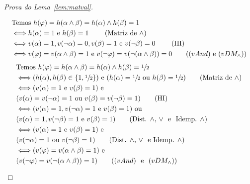 \begin{proof}[Prova do Lema~\ref{lem:matval}]
\begin{provaporcasos}
\begin{provaporsubcasos}
            \end{provaporsubcasos}
        

            \begin{provaporsubcasos}
                \begin{align*}
                    &\text{Temos } h(\phi) = h(\alpha \land \beta) = h(\alpha) \land h(\beta) = 1\\
                    &\Longleftrightarrow h(\alpha) = 1 \text{ e } {h(\beta) = 1} \tag*{ (Matriz de $\land$)}\\
                    &\Longleftrightarrow v(\alpha) = 1, v(\neg \alpha) = 0, v(\beta) = 1 \text{ e } v(\neg \beta) = 0\tag*{ (HI)}\\
                    &\Longleftrightarrow v(\phi) = v(\alpha \land \beta) = 1 \textnormal{ e } v(\neg \phi) = v(\neg(\alpha \land \beta)) = 0\tag*{($(vAnd)$ e $(vDM_{\land})$)}\\
                \end{align*}
                \begin{align*}
                    &\text{Temos } h(\phi) = h(\alpha \land \beta) = h(\alpha) \land h(\beta) = \meio{}\\
                    &\Longleftrightarrow (h(\alpha), h(\beta) \in \{1, \meio{}\})\textnormal{ e }(h(\alpha) = \meio{} \text{ ou } h(\beta) = \meio{}) \tag*{(Matriz de $\land$)}\\
                    &\Longleftrightarrow (v(\alpha) = 1 \text{ e } v(\beta) = 1) \text{ e }\\&(v(\alpha) = v(\neg \alpha) = 1 \text{ ou } v(\beta) = v(\neg \beta) = 1) \tag*{(HI)}\\
                    &\Longleftrightarrow (v(\alpha) = 1, v(\neg \alpha) = 1 \text{ e } v(\beta) = 1) \text{ ou }\\&(v(\alpha) = 1, v(\neg \beta) = 1 \text{ e } v(\beta) = 1) \tag*{(Dist. $\land$, $\lor$ \text{ e } Idemp. $\land$)}\\
                    &\Longleftrightarrow (v(\alpha) = 1 \text{ e } v(\beta) = 1) \text{ e } \\&(v(\neg \alpha) = 1 \text{ ou } v(\neg \beta) = 1) \tag*{(Dist. $\land$, $\lor$ \text{ e }Idemp. $\land$)}\\
                    &\Longleftrightarrow (v(\phi) = v(\alpha \land \beta) = 1) \text{ e } \\&(v(\neg \phi) = v(\neg (\alpha \land \beta)) = 1) \tag*{($(vAnd)$ \text{ e } $(vDM_{\land})$)}
                \end{align*}


\end{provaporsubcasos}
\end{provaporcasos}
\end{proof}
